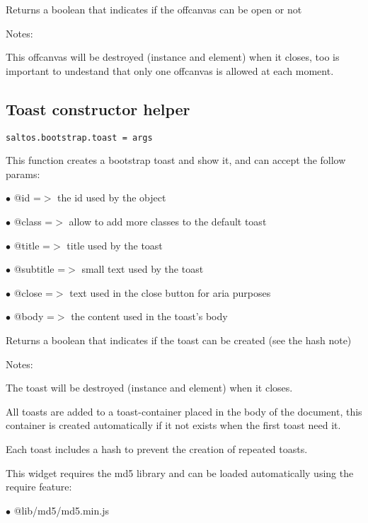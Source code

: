 \documentclass[a4paper]{book}
\begin{document}
Returns a boolean that indicates if the offcanvas can be open or not

Notes:

This offcanvas will be destroyed (instance and element) when it closes, too is important
to undestand that only one offcanvas is allowed at each moment.

\hypertarget{toc477}{}
\subsection{Toast constructor helper}

\begin{lstlisting}
saltos.bootstrap.toast = args
\end{lstlisting}

This function creates a bootstrap toast and show it, and can accept the follow params:

\begin{compactitem}
\item[\color{myblue}$\bullet$] @id       =$>$ the id used by the object
\item[\color{myblue}$\bullet$] @class    =$>$ allow to add more classes to the default toast
\item[\color{myblue}$\bullet$] @title    =$>$ title used by the toast
\item[\color{myblue}$\bullet$] @subtitle =$>$ small text used by the toast
\item[\color{myblue}$\bullet$] @close    =$>$ text used in the close button for aria purposes
\item[\color{myblue}$\bullet$] @body     =$>$ the content used in the toast's body
\end{compactitem}

Returns a boolean that indicates if the toast can be created (see the hash note)

Notes:

The toast will be destroyed (instance and element) when it closes.

All toasts are added to a toast-container placed in the body of the document, this container
is created automatically if it not exists when the first toast need it.

Each toast includes a hash to prevent the creation of repeated toasts.

This widget requires the md5 library and can be loaded automatically using the require
feature:

\begin{compactitem}
\item[\color{myblue}$\bullet$] @lib/md5/md5.min.js
\end{compactitem}
\end{document}
